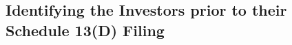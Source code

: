 \documentclass[12pt]{article}
\begin{document}

\subsection{Identifying the Investors prior to their Schedule 13(D) Filing}
\end{document}
